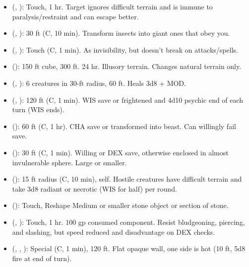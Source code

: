 \begin{itemize}
	\item {} (, ): Touch, 1 hr. Target ignores difficult terrain and is immune to paralysis/restraint and can escape better.
	\item {} (, ): 30 ft (C, 10 min). Transform insects into giant ones that obey you.
	\item {} (, ): Touch (C, 1 min). As invisibility, but doesn't break on attacks/spells.
	\item {} (): 150 ft cube, 300 ft. 24 hr. Illusory terrain. Changes natural terrain only.
	\item {} (, ): 6 creatures in 30-ft radius, 60 ft. Heals 3d8 + MOD.
	\item {} (, ): 120 ft (C, 1 min). WIS save or frightened and 4d10 psychic end of each turn (WIS ends).
	\item {} (): 60 ft (C, 1 hr). CHA save or transformed into beast. Can willingly fail save.
	\item {} (): 30 ft (C, 1 min). Willing or DEX save, otherwise enclosed in almost invulnerable sphere. Large or smaller.
	\item {} (): 15 ft radius (C, 10 min), self. Hostile creatures have difficult terrain and take 3d8 radiant or necrotic (WIS for half) per round.
	\item {} (): Touch, Reshape Medium or smaller stone object or section of stone.
	\item {} (, ): Touch, 1 hr. 100 gp consumed component. Resist bludgeoning, piercing, and slashing, but speed reduced and disadvantage on DEX checks.
	\item {} (, , ): Special (C, 1 min), 120 ft. Flat opaque wall, one side is hot (10 ft, 5d8 fire at end of turn). 
	
\end{itemize}

